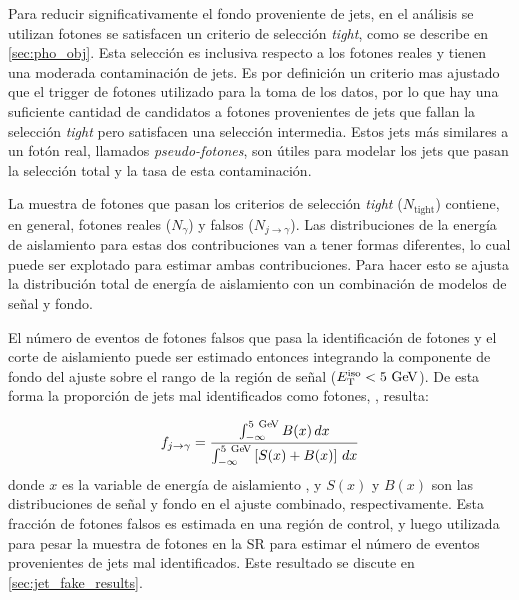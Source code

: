 Para reducir significativamente el fondo proveniente de jets, en el análisis
se utilizan fotones se satisfacen un criterio de selección \emph{tight}, como se
describe en \cref{sec:pho_obj}. Esta selección es inclusiva respecto a los
fotones reales y tienen una moderada contaminación de jets. Es por definición un
criterio mas ajustado que el trigger de fotones utilizado para la toma de los
datos, por lo que hay una suficiente cantidad de candidatos a fotones provenientes de jets
que fallan la selección \emph{tight} pero satisfacen una selección
intermedia. Estos jets más similares a un fotón real, llamados
\emph{pseudo-fotones}, son útiles para modelar los jets que pasan la selección
total y la tasa de esta contaminación.


La muestra de fotones que pasan los criterios de selección \emph{tight}
($N_\text{tight}$) contiene, en general, fotones reales ($N_{\gamma}$) y falsos
($N_{j\to\gamma}$). Las distribuciones de la energía de aislamiento para estas
dos contribuciones van a tener formas diferentes, lo cual puede ser explotado
para estimar ambas contribuciones. Para hacer esto se ajusta la distribución
total de energía de aislamiento con un combinación de modelos de señal y fondo.


El número de eventos de fotones falsos que pasa la identificación de fotones y
el corte de aislamiento puede ser estimado entonces integrando la componente de
fondo del ajuste sobre el rango de la región de señal ($\etiso<5\GeV$). De esta
forma la proporción de jets mal identificados como fotones, \fjg, resulta:

\begin{equation}\label{eq:jfake_formula}
  f_{j\to \gamma} = \frac{\int_{-\infty}^{5\gev} B(x)\, dx}{\int_{-\infty}^{5\gev} \left[S(x)+B(x)\right]\, dx}
\end{equation}
%
donde $x$ es la variable de energía de aislamiento \etiso, y $S(x)$ y $B(x)$
son las distribuciones de señal y fondo en el ajuste combinado, respectivamente.
Esta fracción de fotones falsos es estimada en una región de control, y luego
utilizada para pesar la muestra de fotones en la SR para estimar el número de
eventos provenientes de jets mal identificados. Este resultado se discute en
\cref{sec:jet_fake_results}.



